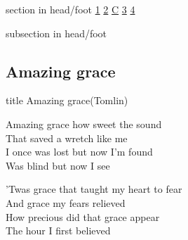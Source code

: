 \documentclass{beamer}
\begin{document}
{
{ 
 {
 \begin{beamercolorbox}[ht=4.5ex,dp=1.5ex,%
      leftskip=.3cm,rightskip=.3cm plus1fil]{section in head/foot}
 \fontsize{12}{25}\selectfont 
\hyperlink{Amazing grace['My chains are gone'](Tomlin)1}{1}
\hyperlink{Amazing grace['My chains are gone'](Tomlin)2}{2}
\hyperlink{Amazing grace['My chains are gone'](Tomlin)C}{C}
\hyperlink{Amazing grace['My chains are gone'](Tomlin)3}{3}
\hyperlink{Amazing grace['My chains are gone'](Tomlin)4}{4}
 
 \end{beamercolorbox}%
  \begin{beamercolorbox}[ht=2.5ex,dp=1.125ex,%
   leftskip=.3cm,rightskip=.3cm plus1fil]{subsection in head/foot}
   \insertauthor
 \end{beamercolorbox}%
 }
}
\subsection{ Amazing grace }

\hypertarget{Amazing grace['My chains are gone'](Tomlin)}{}
\begin{frame}{}
 \vfill
  \centering
  \begin{beamercolorbox}[sep=8pt,center,shadow=true,rounded=true]{title}
    Amazing grace(Tomlin)    
  \end{beamercolorbox}
  \vfill
\end{frame}

\hypertarget{Amazing grace['My chains are gone'](Tomlin)1}{}
\begin{frame}{}
\fontsize{ 18 }{ 23 }\selectfont

Amazing grace how sweet the sound\\ 
That saved a wretch like me\\ 
I once was lost but now I'm found\\ 
Was blind but now I see 

\end{frame}

\hypertarget{Amazing grace['My chains are gone'](Tomlin)2}{}
\begin{frame}{}
\fontsize{ 18 }{ 23 }\selectfont

'Twas grace that taught my heart to fear\\ 
And grace my fears relieved\\ 
How precious did that grace appear\\ 
The hour I first believed 


\end{frame}}
\end{document}
